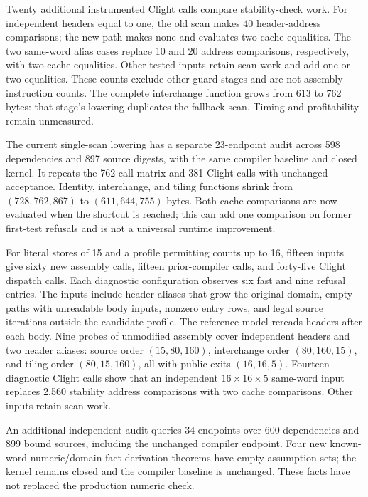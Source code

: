 Twenty additional instrumented Clight calls compare stability-check work.
For independent headers equal to one, the old scan makes 40 header-address
comparisons; the new path makes none and evaluates two cache equalities. The
two same-word alias cases replace 10 and 20 address comparisons, respectively,
with two cache equalities. Other tested inputs retain scan work and add one or
two equalities. These counts exclude other guard stages and are not assembly
instruction counts. The complete interchange function grows from 613 to 762
bytes: that stage's lowering duplicates the fallback scan. Timing and
profitability remain unmeasured.

The current single-scan lowering has a separate 23-endpoint audit across 598
dependencies and 897 source digests, with the same compiler baseline and closed
kernel. It repeats the 762-call matrix and 381 Clight calls with unchanged
acceptance. Identity, interchange, and tiling functions shrink from
$(728,762,867)$ to $(611,644,755)$ bytes. Both cache comparisons are now evaluated
when the shortcut is reached; this can add one comparison on former first-test
refusals and is not a universal runtime improvement.

For literal stores of 15 and a profile permitting counts up to 16, fifteen
inputs give sixty new assembly calls, fifteen prior-compiler calls, and
forty-five Clight dispatch calls. Each diagnostic configuration observes six
fast and nine refusal entries. The inputs include header aliases that grow the
original domain, empty paths with unreadable body inputs, nonzero entry rows,
and legal source iterations outside the candidate profile. The reference model
rereads headers after each body. Nine probes of unmodified assembly cover
independent headers and two header aliases: source order $(15,80,160)$,
interchange order $(80,160,15)$, and tiling order $(80,15,160)$, all with public
exits $(16,16,5)$. Fourteen diagnostic Clight calls show that an independent
$16\times16\times5$ same-word input replaces 2,560 stability address comparisons
with two cache comparisons. Other inputs retain scan work.

An additional independent audit queries 34 endpoints over 600 dependencies and
899 bound sources, including the unchanged compiler endpoint. Four new
known-word numeric/domain fact-derivation theorems have empty assumption sets;
the kernel remains closed and the compiler baseline is unchanged. These facts
have not replaced the production numeric check.

